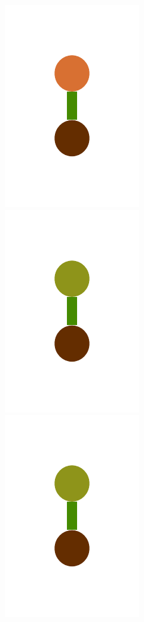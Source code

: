 \documentclass[a4paper,10pt]{article}
\begin{document}
\begin{figure}[t]
\includegraphics[scale=.26]{./figures/4-2-4-noisy-constructor-example-a-0.pdf}
\includegraphics[scale=.26]{./figures/4-2-4-noisy-constructor-example-b-0.pdf}
\includegraphics[scale=.26]{./figures/4-2-4-noisy-constructor-example-b-0.pdf}

\end{figure}
\end{document}
